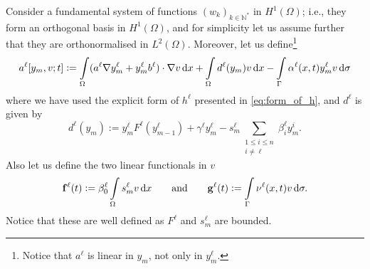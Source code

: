 \documentclass[11pt]{article}
\newcommand{\N}{\mathbb{N}}
\numberwithin{equation}{section}
\begin{document}
	Consider a fundamental system of functions \((w_k)_{k\in \N^*}\) in \(H^1(\Omega)\); i.e., they form an orthogonal basis in \(H^1(\Omega)\), and for simplicity let us assume further that they are orthonormalised in \(L^2(\Omega)\). Moreover, let us define\footnote{Notice that \(a^\ell\) is linear in \( y_m\), not only in \(y_m^\ell\).}
	\[
		a^\ell [ y_m,v;t] := 
		\int\limits_\Omega (a^\ell \nabla y_m^\ell + y_m^\ell b^\ell ) \cdot \nabla v \dif x + \int\limits_\Omega d^\ell (y_m) v \dif x
		- \int\limits_\Gamma \alpha^\ell (x,t) y_m^\ell v \dif \sigma
	\]
	where we have used the explicit form of \(h^\ell\) presented in \eqref{eq:form_of_h}, and \(d^\ell\) is given by
	\[
		d^\ell (y_m) := y_m^\ell F^\ell(y_{m-1}^\ell) + \gamma^\ell y_m^\ell - s_m^\ell \sum_{\substack{1\le i\le n\\ i\neq \ell}} \beta_i^\ell y_m^i.
	\]
	Also let us define the two linear functionals in \(v\)
	\[
		\mathbf{f}^\ell (t) := \beta_0^\ell \int\limits_\Omega s_m^\ell  v \dif x
		\qquad\text{and}\qquad
		\mathbf{g}^\ell (t) :=  \int\limits_\Gamma \nu^\ell (x,t)  v \dif \sigma.
	\]
	Notice that these are well defined as \(F^\ell\) and \(s_m^\ell\) are bounded.
	
	
	
	
	
\end{document}
